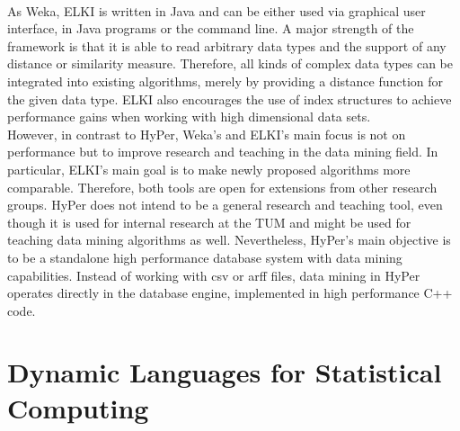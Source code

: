 \\
As Weka, ELKI is written in Java and can be either used via graphical user interface, in Java programs or the command line. A major strength of the framework is that it is able to read arbitrary data types and the support of any distance or similarity measure. Therefore, all kinds of complex data types can be integrated into existing algorithms, merely by providing a distance function for the given data type. ELKI also encourages the use of index structures to achieve performance gains when working with high dimensional data sets. 
\\
However, in contrast to HyPer, Weka's and ELKI's main focus is not on performance but to improve research and teaching in the data mining field. In particular, ELKI's main goal is to make newly proposed algorithms more comparable. Therefore, both tools are open for extensions from other research groups. HyPer does not intend to be a general research and teaching tool, even though it is used for internal research at the TUM and might be used for teaching data mining algorithms as well. Nevertheless, HyPer's main objective is to be a standalone high performance database system with data mining capabilities. Instead of working with csv or arff files, data mining in HyPer operates directly in the database engine, implemented in high performance C++ code. 


\section{Dynamic Languages for Statistical Computing}

